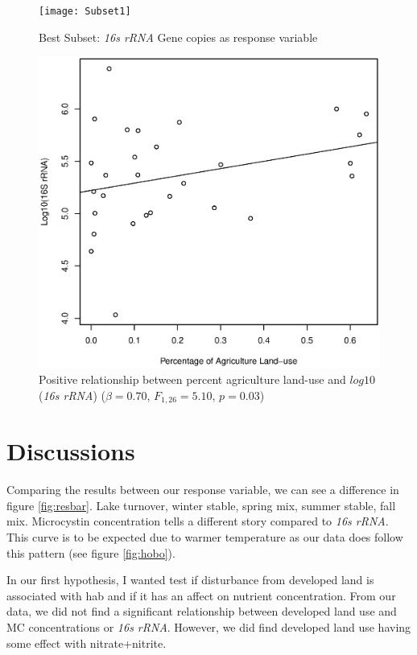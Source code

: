 \begin{figure}[!ht]
  \texttt{[image: Subset1]}
  \caption{Best Subset: \emph{16s rRNA} Gene copies as response variable}
  \label{subset2}
\end{figure}

\begin{figure}[!ht]
  \includegraphics[width=\textwidth]{figures/Agriculture}
  \caption{Positive relationship between percent agriculture land-use and $log10$(\emph{16s rRNA}) ($\beta=0.70$, $F_{{1,26}}=5.10$, $p=0.03$)}
  \label{fig:agriculture}
\end{figure}
\clearpage

\section{Discussions}




Comparing the results between our response variable, we can see a difference in figure \ref{fig:resbar}.
Lake turnover, winter stable, spring mix, summer stable, fall mix. 
Microcystin concentration tells a different story compared to \emph{16s rRNA}. This curve is to be expected due to warmer temperature as our data does follow this pattern (see figure \ref{fig:hobo}).

In our first hypothesis, I wanted test if disturbance from developed land is associated with \gls{hab} and if it has an affect on nutrient concentration.  From our data, we did not find a significant relationship between developed land use and MC concentrations or \emph{16s rRNA}. However, we did find developed land use having some effect with nitrate+nitrite.

